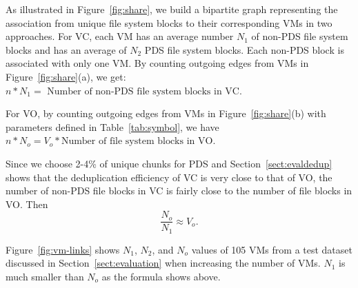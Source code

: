 As illustrated in Figure~\ref{fig:share}, we build a bipartite graph representing the
association from unique file system blocks to their corresponding VMs in two 
approaches. 
For VC, each VM has an average number $N_1$ of non-PDS file system blocks
and  has  an average of  $N_2$ PDS file system blocks. 
Each non-PDS block is associated with only one VM.
By counting outgoing edges from VMs in Figure~\ref{fig:share}(a), we get:
$
n* N_1   = \mbox{ Number of non-PDS file system blocks in VC.} 
$

For VO, 
by counting outgoing edges from VMs in Figure~\ref{fig:share}(b) with parameters defined in
Table~\ref{tab:symbol},  we have 
$
n *N_o   =  V_o * \mbox{Number of file system blocks in VO}.
$

Since we choose 2-4\% of unique chunks for PDS
and Section~\ref{sect:evaldedup} 
shows that the deduplication efficiency of VC is very close to that of VO,
the number of non-PDS file blocks in VC is fairly close to the number of file blocks in VO.
Then
\[
\frac{N_o}{N_1} \approx  V_o.
\]

Figure~\ref{fig:vm-links} shows $N_1$, $N_2$, and $N_o$ values of 105 VMs from a  test dataset 
discussed in Section~\ref{sect:evaluation} when increasing the number of VMs.  
$N_1$ is much smaller than $N_o$ as the formula shows above. 




